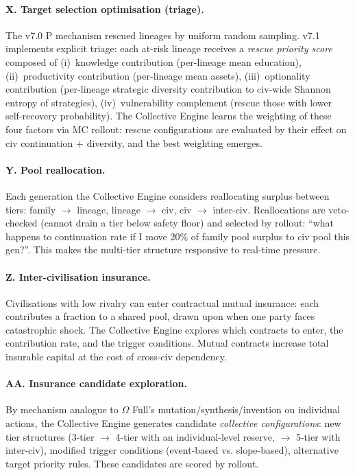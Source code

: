 \paragraph{X. Target selection optimisation (triage).}
The v7.0 P mechanism rescued lineages by uniform random sampling.
v7.1 implements explicit triage: each at-risk lineage receives a
\emph{rescue priority score} composed of (i)~knowledge contribution
(per-lineage mean education), (ii)~productivity contribution
(per-lineage mean assets), (iii)~optionality contribution
(per-lineage strategic diversity contribution to civ-wide Shannon
entropy of strategies), (iv)~vulnerability complement (rescue those
with lower self-recovery probability). The Collective Engine learns
the weighting of these four factors via MC rollout: rescue
configurations are evaluated by their effect on civ continuation
$+$ diversity, and the best weighting emerges.

\paragraph{Y. Pool reallocation.}
Each generation the Collective Engine considers reallocating surplus
between tiers: family $\to$ lineage, lineage $\to$ civ, civ
$\to$ inter-civ. Reallocations are veto-checked (cannot drain a tier
below safety floor) and selected by rollout: ``what happens to
continuation rate if I move 20\% of family pool surplus to civ pool
this gen?''. This makes the multi-tier structure responsive to
real-time pressure.

\paragraph{Z. Inter-civilisation insurance.}
Civilisations with low rivalry can enter contractual mutual
insurance: each contributes a fraction to a shared pool, drawn upon
when one party faces catastrophic shock. The Collective Engine
explores which contracts to enter, the contribution rate, and the
trigger conditions. Mutual contracts increase total insurable
capital at the cost of cross-civ dependency.

\paragraph{AA. Insurance candidate exploration.}
By mechanism analogue to $\Omega$ Full's mutation/synthesis/invention
on individual actions, the Collective Engine generates candidate
\emph{collective configurations}: new tier structures (3-tier $\to$
4-tier with an individual-level reserve, $\to$ 5-tier with
inter-civ), modified trigger conditions (event-based vs.
slope-based), alternative target priority rules. These candidates
are scored by rollout.

